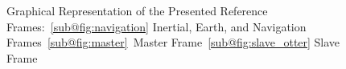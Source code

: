 \begin{figure}[H]
	\caption{Graphical Representation of the Presented Reference Frames:~\ref{sub@fig:navigation} Inertial, Earth, and Navigation Frames~\ref{sub@fig:master}~Master Frame~\ref{sub@fig:slave_otter} Slave Frame
	}\label{fig:frames}
\end{figure}
